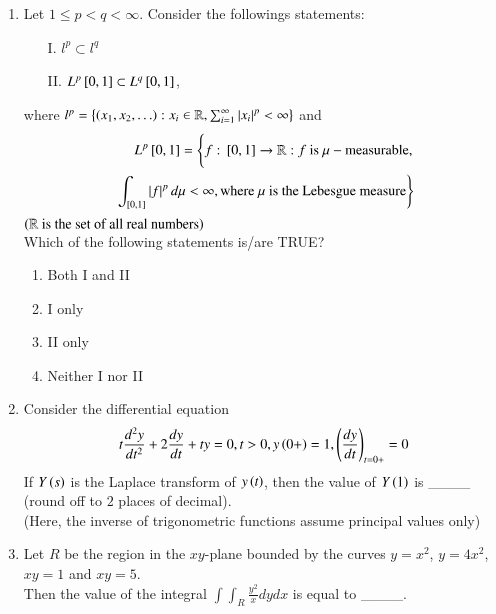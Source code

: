 \documentclass[journal]{IEEEtran}
\begin{document}
\begin{enumerate}
    \item Let $1 \leq p < q < \infty$. Consider the followings statements: 
        \begin{itemize}
            \item [I.] $l^p \subset l^q$
            \item [II.] $L^p {}\left[0,1\right] \subset L^q{}\left[0,1\right]$,
        \end{itemize}

        where $l^p = \left\{\left(x_1,x_2, \ldots\right) : x_i \in \mathbb{R}, \sum_{i=1}^{\infty} \left\vert x_i\right\vert^p < \infty\right\}$ and 
        \begin{align*}
            L^p \sbrak{0,1} = \lcbrak{f:\sbrak{0,1} \rightarrow \mathbb{R}:f \text{ is } \mu-\text{measurable,} \vphantom{\int_{1}^{0}}} \\  \vphantom{\int_{1}^{0}} \rcbrak{\int_{\sbrak{0,1}} \abs{f}^p d \mu < \infty, \text{where } \mu \text{ is the Lebesgue measure}}
        \end{align*}
        $\left(\mathbb{R} \text{ is the set of all real numbers}\right)$\\
        Which of the following statements is/are TRUE?

        \begin{enumerate}
            \item Both I and II
            \item I only
            \item II only
            \item Neither I nor II
        \end{enumerate}

        \item Consider the differential equation 
            \begin{align*}
                t \frac{d^2 y}{dt^2} + 2 \frac{dy}{dt} + ty = 0, t>0, y\left(0+\right) = 1, \left(\frac{dy}{dt}\right)_{t=0+} = 0
            \end{align*}
            If $Y\left(s\right)$ is the Laplace transform of $y\left(t\right)$, then the value of $Y\left(1\right)$ is \_\_\_\_ (round off to $2$ places of decimal). \\
            (Here, the inverse of trigonometric functions assume principal values only)

    \item Let $R$ be the region in the $xy$-plane bounded by the curves $y = x^2$, $y=4x^2$, $xy=1$ and $xy=5$.\\ 
            Then the value of the integral $\int \int_{R} \frac{y^2}{x} dy dx$ is equal to \_\_\_\_.


\end{enumerate}
\end{document}
